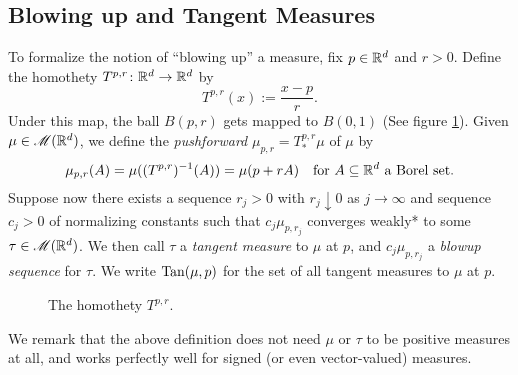 \subsection{Blowing up and Tangent Measures} \label{sec:blowingUp}
To formalize the notion of ``blowing up'' a measure, fix $p \in \mathbb{R}^d$ and $r > 0$. Define the homothety $T^{p,r} \colon \mathbb{R}^d \to \mathbb{R}^d$ by 
\begin{equation}
    T^{p,r}(x) := \frac{x - p}{r}.
\end{equation}
Under this map, the ball $B(p,r)$ gets mapped to $B(0,1)$ (See figure \ref{fig:homothety}). Given $\mu \in \mathscr{M}(\mathbb{R}^d)$, we define the \textit{pushforward} $\mu_{p,r} = T^{p,r}_*\mu$ of $\mu$ by
\begin{equation}
    \mu_{p,r}(A) = \mu((T^{p,r})^{-1}(A)) = \mu(p + rA) \quad \text{for } A \subseteq \mathbb{R}^d \text{ a Borel set.}
\end{equation}
Suppose now there exists a sequence $r_j > 0$ with $r_j \downarrow 0$ as $j \rightarrow \infty$ and sequence $c_j > 0$ of normalizing constants such that $c_j \mu_{p,r_j}$ converges weakly* to some $\tau \in \mathscr{M}(\mathbb{R}^d)$. We then call $\tau$ a \textit{tangent measure} to $\mu$ at $p$, and $c_j \mu_{p,r_j}$ a \textit{blowup sequence} for $\tau$. We write $\operatorname{Tan}(\mu,p)$ for the set of all tangent measures to $\mu$ at $p$.

\begin{figure} 
    \centering
    \caption{The homothety $T^{p,r}$.}
    \label{fig:homothety}
\end{figure}

We remark that the above definition does not need $\mu$ or $\tau$ to be positive measures at all, and works perfectly well for signed (or even vector-valued) measures.

